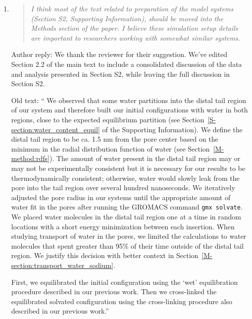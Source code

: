 \documentclass{article}
\begin{document}
\begin{enumerate}
    \item \begin{quote}
    
    \textit{I think most of the text related to preparation of the model systems (Section S2, 
    Supporting Information), should be moved into the Methods section of the paper. I believe 
    these simulation setup details are important to researchers working with somewhat similar 
    systems.}
    
    \end{quote}
    
    Author reply: We thank the reviewer for their suggestion. We've edited Section 2.2 of the main
    text to include a consolidated discussion of the data and analysis presented in Section S2, 
    while leaving the full discussion in Section S2.
    
    Old text: `` We observed that some water partitions into the distal tail region of our system and therefore
	built our initial configurations with water in both regions, close to the expected
	equilibrium partition (see Section~\ref{S-section:water_content_equil} of the Supporting
	Information). We define the distal tail region to be ca. 1.5 nm from the pore
	center based on the minimum in the radial distribution function of water
	(see Section~\ref{M-method:rdfs}). The amount of water present in the distal tail region
	may or may not be experimentally consistent but it is necessary for our results to be 
	thermodynamically consistent; otherwise, water would slowly leak from the pore into the
	tail region over several hundred nanoseconds. We iteratively adjusted the pore radius in our systems
	until the appropriate amount of water fit in the pores after running the GROMACS command
	\texttt{gmx solvate}. We placed water molecules in the distal tail region one at a time
	in random locations with a short energy minimization between each insertion. When 
	studying transport of water in the pores, we limited the calculations to water molecules
	that spent greater than 95\% of their time outside of the distal tail region. We 
	justify this decision with better context in Section~\ref{M-section:transport_water_sodium}.
	
    First, we equilibrated the initial configuration using the `wet' equilibration procedure 
	described in our previous work. Then we cross-linked the equilibrated solvated 
	configuration using the cross-linking procedure also described in our previous 
    work.''
           

\end{enumerate}
\end{document}
